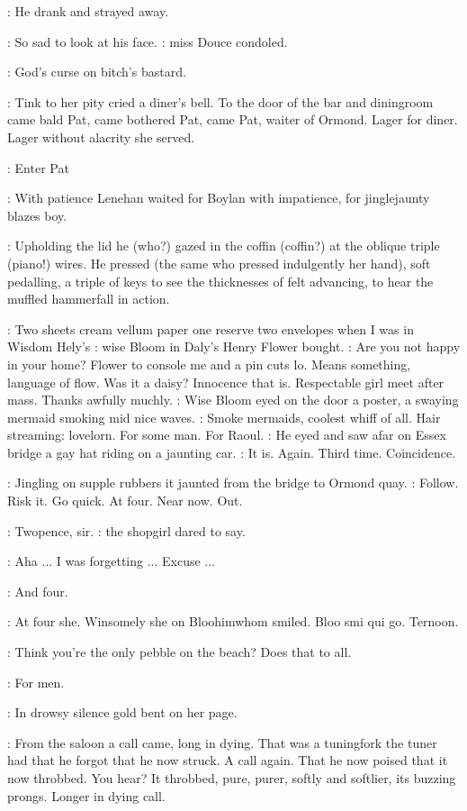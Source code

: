 :
He drank and strayed away.

\MissD:
So sad to look at his face.
:
miss Douce condoled.

\Stripling:
God's curse on bitch's bastard.

:
Tink to her pity cried a diner's bell. To the door of the bar and
diningroom came bald Pat, came bothered Pat, came Pat, waiter of
Ormond. Lager for diner. Lager without alacrity she served.

\Stage:
Enter Pat

:
With patience Lenehan waited for Boylan with impatience, for
jinglejaunty
blazes boy.

:
Upholding the lid he (who?) gazed in the coffin (coffin?) at the
oblique triple (piano!) wires. He pressed (the same who pressed
indulgently her hand), soft pedalling, a triple of keys to see the
thicknesses of felt advancing, to hear the muffled hammerfall in action.

\BloomInt:
Two sheets cream vellum paper one reserve two envelopes when I was
in Wisdom Hely's
:
wise Bloom in Daly's Henry Flower bought.
\BloomInt:
Are you not
happy in your home? Flower to console me and a pin cuts lo. Means
something, language of flow. Was it a daisy? Innocence that is.
Respectable girl meet after mass. Thanks awfully muchly.
:
Wise Bloom eyed
on the door a poster,
a swaying mermaid smoking mid nice waves.
\BloomInt:
Smoke mermaids, coolest whiff of all. Hair streaming: lovelorn.
For some man.
For Raoul.
:
He eyed and saw afar on Essex bridge a gay hat riding on a
jaunting car.
\BloomInt:
It is. Again. Third time. Coincidence.

:
Jingling on supple rubbers it jaunted from the bridge to
Ormond quay.
\BloomInt:
Follow. Risk it. Go quick. At four. Near now. Out.

\shopgirl:
Twopence, sir.
:
the shopgirl dared to say.

\Bloom:
Aha ... I was forgetting ... Excuse ...

\shopgirl:
And four.

\BloomInt:
At four she. Winsomely she on Bloohimwhom smiled. Bloo smi qui go.
Ternoon.

\BloomInt:
Think you're the only pebble on the beach?
Does that to all.

\BloomInt:
For men.

:
In drowsy silence gold bent on her page.

:
From the saloon a call came, long in dying. That was a tuningfork the
tuner had that he forgot that he now struck. A call again. That he now
poised that it now throbbed. You hear? It throbbed, pure, purer, softly
and softlier, its buzzing prongs. Longer in dying call.


